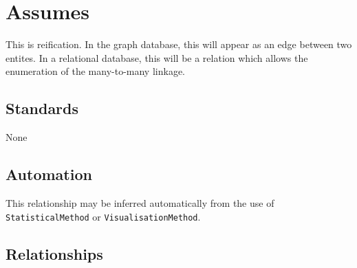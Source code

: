 \documentclass[
]{article}
\begin{document}
\section{Assumes}\label{assumes}

This is reification. In the graph database, this will appear as an edge
between two entites. In a relational database, this will be a relation
which allows the enumeration of the many-to-many linkage.

\subsection{Standards}\label{standards-4}

None

\subsection{Automation}\label{automation-4}

This relationship may be inferred automatically from the use of
\texttt{StatisticalMethod} or \texttt{VisualisationMethod}.

\subsection{Relationships}\label{relationships-3}
\end{document}
